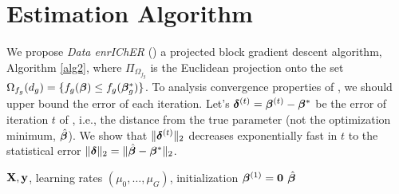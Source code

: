 \section{Estimation Algorithm}
\label{sec:opt}
We propose \emph{Data enrIChER} (\dc) a projected block gradient descent algorithm, Algorithm \ref{alg2}, where $\Pi_{\Omega_{f_g}}$ is the Euclidean projection onto the set $\Omega_{f_g}(d_g) = \{f_g(\boldsymbol{\beta}) \leq f_g(\boldsymbol{\beta}_g^*)\}$.%
To analysis convergence properties of \dc, we should upper bound the error of each iteration.%
Let's $\boldsymbol{\delta}^{(t)} = \boldsymbol{\beta}^{(t)} - \boldsymbol{\beta}^*$ be the error of  iteration $t$ of \dc, i.e., the distance from the true parameter (not the optimization minimum, $\hat{\boldsymbol{\beta}}$).
We show that $\|\boldsymbol{\delta}^{(t)}\|_{2}$ decreases exponentially fast in $t$ to the statistical error $\|\boldsymbol{\delta}\|_{2} = \|\hat{\boldsymbol{\beta}} - \boldsymbol{\beta}^*\|_{2}$.
\begin{algorithm}[t]
	\caption{  \dc }
	\label{alg2}
	\begin{algorithmic}[1]
		 $\mathbf{X}, \mathbf{y}$, learning rates $(\mu_0, \dots, \mu_G)$, initialization $\boldsymbol{\beta} ^{(1)} = \mathbf{0}$
		 $\hat{\boldsymbol{\beta}}$
		\ENDFOR
		\ENDFOR
	\end{algorithmic}
\end{algorithm}
